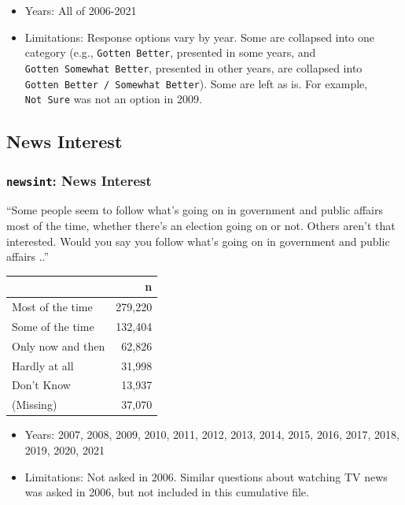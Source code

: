 \documentclass[10pt,article,oneside]{memoir}
\theoremstyle{definition}
\begin{document}
\begin{itemize}
\tightlist
\item
  Years: All of 2006-2021
\item
  Limitations: Response options vary by year. Some are collapsed into
  one category (e.g., \texttt{Gotten\ Better}, presented in some years,
  and \texttt{Gotten\ Somewhat\ Better}, presented in other years, are
  collapsed into \texttt{Gotten\ Better\ /\ Somewhat\ Better}). Some are
  left as is. For example, \texttt{Not\ Sure} was not an option in 2009.
\end{itemize}

\hypertarget{news-interest}{%
\subsection{News Interest}\label{news-interest}}

\hypertarget{newsint-news-interest}{%
\subsubsection{\texorpdfstring{\texttt{newsint}: News
Interest}{newsint: News Interest}}\label{newsint-news-interest}}

``Some people seem to follow what's going on in government and public
affairs most of the time, whether there's an election going on or not.
Others aren't that interested. Would you say you follow what's going on
in government and public affairs ..''

\begin{table}[H]
\centering
\begin{tabular}[t]{lr}
\toprule
 & n\\
\midrule
Most of the time & 279,220\\
Some of the time & 132,404\\
Only now and then & 62,826\\
Hardly at all & 31,998\\
Don't Know & 13,937\\
(Missing) & 37,070\\
\bottomrule
\end{tabular}
\end{table}

\begin{itemize}
\tightlist
\item
  Years: 2007, 2008, 2009, 2010, 2011, 2012, 2013, 2014, 2015, 2016,
  2017, 2018, 2019, 2020, 2021
\item
  Limitations: Not asked in 2006. Similar questions about watching TV
  news was asked in 2006, but not included in this cumulative file.
\end{itemize}
\end{document}
